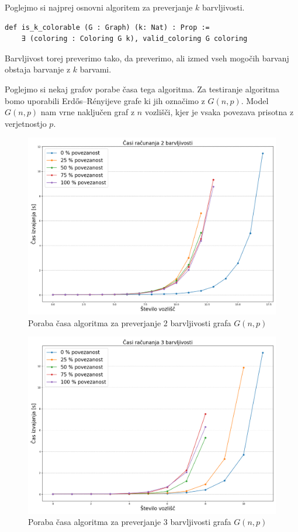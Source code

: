 \documentclass[mat1]{fmfdelo}
\begin{document}
Poglejmo si najprej osnovni algoritem za preverjanje $k$ barvljivosti.
\begin{lstlisting}
def is_k_colorable (G : Graph) (k: Nat) : Prop :=
    ∃ (coloring : Coloring G k), valid_coloring G coloring
\end{lstlisting}

Barvljivost torej preverimo tako, da preverimo, ali izmed vseh mogočih barvanj obstaja barvanje z $k$ barvami.

Poglejmo si nekaj grafov porabe časa tega algoritma. Za testiranje algoritma bomo uporabili Erdős–Rényijeve grafe
ki jih označimo z $G(n, p)$. Model $G(n, p)$ nam vrne naključen graf z $n$ vozlišči, kjer je vsaka povezava prisotna z verjetnostjo $p$.

\begin{figure}[H]
\begin{center}
\includegraphics[scale=0.35]{assets/2barvSlow}
\caption{Poraba časa algoritma za preverjanje 2 barvljivosti grafa $G(n, p)$}
\label{slika2}
\end{center}
\end{figure}

\begin{figure}[H]
\begin{center}
\includegraphics[scale=0.35]{assets/3barvSlow}
\caption{Poraba časa algoritma za preverjanje 3 barvljivosti grafa $G(n, p)$}
\label{slika2}
\end{center}
\end{figure}
\end{document}

